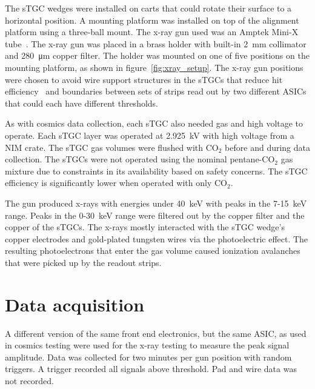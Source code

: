 The sTGC wedges were installed on carts that could rotate their surface to a horizontal position. A mounting platform was installed on top of the alignment platform using a three-ball mount. The x-ray gun used was an Amptek Mini-X tube~\cite{xray_gun}. The x-ray gun was placed in a brass holder with built-in \SI{2}{mm} collimator and \SI{280}{\micro\meter} copper filter. The holder was mounted on one of five positions on the mounting platform, as shown in figure~\ref{fig:xray_setup}. The x-ray gun positions were chosen to avoid wire support structures in the sTGCs that reduce hit efficiency~\cite{lefebvre_thesis} and boundaries between sets of strips read out by two different ASICs that could each have different thresholds. 

As with cosmics data collection, each sTGC also needed gas and high voltage to operate. Each sTGC layer was operated at \SI{2.925}{kV} with high voltage from a NIM crate. The sTGC gas volumes were flushed with CO$_2$ before and during data collection. The sTGCs were not operated using the nominal pentane-CO$_2$ gas mixture due to constraints in its availability based on safety concerns. The sTGC efficiency is significantly lower when operated with only CO$_2$.

The gun produced x-rays with energies under \SI{40}{\kilo\electronvolt} with peaks in the 7-\SI{15}{keV} range. Peaks in the 0-\SI{30}{keV} range were filtered out by the copper filter and the copper of the sTGCs. The x-rays mostly interacted with the sTGC wedge's copper electrodes and gold-plated tungsten wires via the photoelectric effect. The resulting photoelectrons that enter the gas volume caused ionization avalanches that were picked up by the readout strips.

\section{Data acquisition}

A different version of the same front end electronics, but the same ASIC, as used in cosmics testing were used for the x-ray testing to measure the peak signal amplitude. Data was collected for two minutes per gun position with random triggers. A trigger recorded all signals above threshold. Pad and wire data was not recorded.

